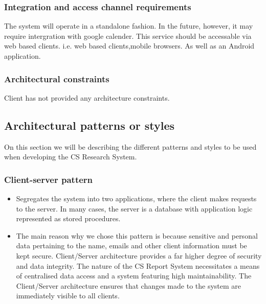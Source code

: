 \documentclass{article}
\begin{document}
			\subsubsection{Integration and access channel requirements}
				The system will operate in a standalone fashion. In the future, however, it may require intergration with google calender.
				This service should be accessable via web based clients. i.e. web based clients,mobile browsers. As well as an Android application.

			\subsubsection{Architectural constraints}
				Client has not provided any architecture constraints.
				
				
				
				

		\subsection{Architectural patterns or styles}
		On this section we will be describing the different patterns and styles to be used when developing the CS 		        Research System.
		\setcounter{secnumdepth}{5}
		\subsubsection{Client-server pattern} %
		\begin{itemize}
		 \item Segregates the system into two applications, where the client makes requests to the server. In many 				cases, the server is a database with application logic represented as stored procedures.
		

         \item  The main reason why we chose this pattern is because sensitive and personal data pertaining to the 				name, emails and other client information must be kept secure. Client/Server architecture provides a far 			higher 	degree of security and data integrity. The nature of the CS Report System necessitates a means of 				centralised data access and a system featuring high maintainability. The Client/Server architecture ensures that changes 	made to the system are immediately visible to all clients.
         \end{itemize}
\end{document}
